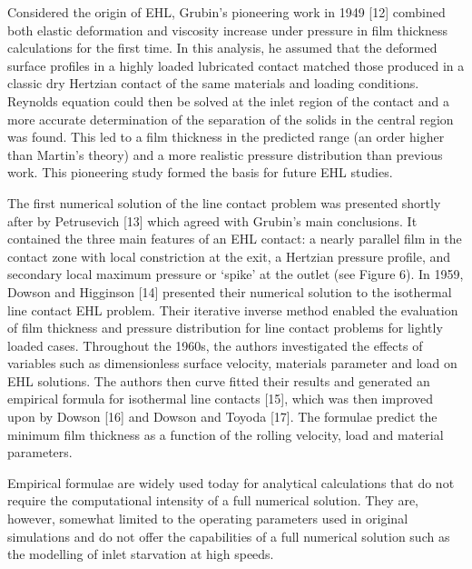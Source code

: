 Considered the origin of EHL, Grubin’s pioneering work in 1949 [12] combined both elastic deformation and viscosity increase under pressure in film thickness calculations for the first time. In this analysis, he assumed that the deformed surface profiles in a highly loaded lubricated contact matched those produced in a classic dry Hertzian contact of the same materials and loading conditions. Reynolds equation could then be solved at the inlet region of the contact and a more accurate determination of the separation of the solids in the central region was found. This led to a film thickness in the predicted range (an order higher than Martin’s theory) and a more realistic pressure distribution than previous work. This pioneering study formed the basis for future EHL studies.

The first numerical solution of the line contact problem was presented shortly after by Petrusevich [13] which agreed with Grubin’s main conclusions. It contained the three main features of an EHL contact: a nearly parallel film in the contact zone with local constriction at the exit, a Hertzian pressure profile, and secondary local maximum pressure or ‘spike’ at the outlet (see Figure 6). In 1959, Dowson and Higginson [14] presented their numerical solution to the isothermal line contact EHL problem. Their iterative inverse method enabled the evaluation of film thickness and pressure distribution for line contact problems for lightly loaded cases. Throughout the 1960s, the authors investigated the effects of variables such as dimensionless surface velocity, materials parameter and load on EHL solutions. The authors then curve fitted their results and generated an empirical formula for isothermal line contacts [15], which was then improved upon by Dowson [16] and Dowson and Toyoda [17]. The formulae predict the minimum film thickness as a function of the rolling velocity, load and material parameters.

Empirical formulae are widely used today for analytical calculations that do not require the computational intensity of a full numerical solution. They are, however, somewhat limited to the operating parameters used in original simulations and do not offer the capabilities of a full numerical solution such as the modelling of inlet starvation at high speeds.
